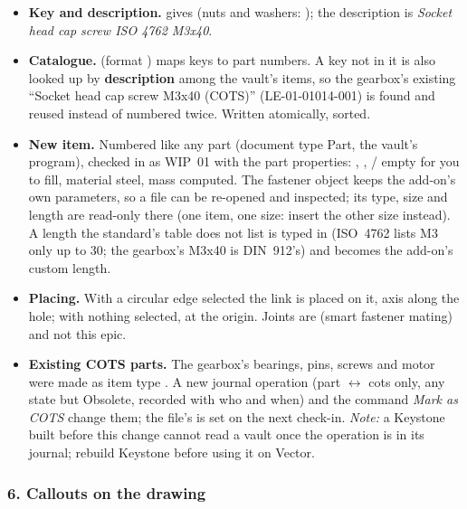 \begin{itemize}[nosep]
  \item \textbf{Key and description.}  gives  (nuts and
        washers: ); the description is \emph{Socket head cap screw ISO 4762 M3x40}.
  \item \textbf{Catalogue.}  (format ) maps keys to part
        numbers. A key not in it is also looked up by \textbf{description} among the vault's items, so the
        gearbox's existing ``Socket head cap screw M3x40 (COTS)'' (LE-01-01014-001) is found and reused
        instead of numbered twice. Written atomically, sorted.
  \item \textbf{New item.} Numbered like any part (document type Part, the vault's program), checked in as
        WIP~01 with the part properties: , ,  /
         empty for you to fill, material steel, mass computed. The fastener object
        keeps the add-on's own parameters, so a file can be re-opened and inspected; its type, size and length
        are read-only there (one item, one size: insert the other size instead). A length the standard's table
        does not list is typed in (ISO~4762 lists M3 only up to 30; the gearbox's M3x40 is DIN~912's) and
        becomes the add-on's custom length.
  \item \textbf{Placing.} With a circular edge selected the link is placed on it, axis along the hole; with
        nothing selected, at the origin. Joints are  (smart fastener mating) and not this epic.
  \item \textbf{Existing COTS parts.} The gearbox's bearings, pins, screws and motor were made as item type
        . A new journal operation  (part $\leftrightarrow$ cots only, any
        state but Obsolete, recorded with who and when) and the command \emph{Mark as COTS} change them;
        the file's  is set on the next check-in. \emph{Note:} a Keystone built before this
        change cannot read a vault once the operation is in its journal; rebuild Keystone before using it on
        Vector.
\end{itemize}

\subsubsection*{6. Callouts on the drawing}

